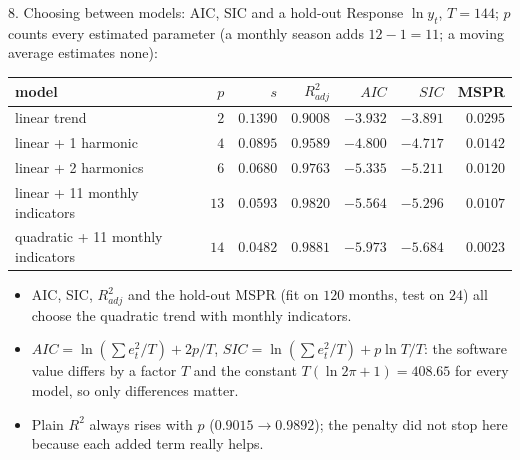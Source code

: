 \documentclass[aspectratio=169,11pt]{beamer}
\begin{document}
\begin{frame}{8. Choosing between models: AIC, SIC and a hold-out}
  \small
  Response $\ln y_t$, $T=144$; $p$ counts every estimated parameter (a monthly
  season adds $12-1=11$; a moving average estimates none):

  \vspace{0.3em}
  {\scriptsize\setlength{\tabcolsep}{3pt}
  \begin{tabular}{@{}lrrrrrr@{}}
    \toprule
    model & $p$ & $s$ & $R^2_{adj}$ & $AIC$ & $SIC$ & MSPR \\
    \midrule
    linear trend                  & $2$  & $0.1390$ & $0.9008$ & $-3.932$ & $-3.891$ & $0.0295$ \\
    linear + 1 harmonic           & $4$  & $0.0895$ & $0.9589$ & $-4.800$ & $-4.717$ & $0.0142$ \\
    linear + 2 harmonics          & $6$  & $0.0680$ & $0.9763$ & $-5.335$ & $-5.211$ & $0.0120$ \\
    linear + 11 monthly indicators & $13$ & $0.0593$ & $0.9820$ & $-5.564$ & $-5.296$ & $0.0107$ \\
    quadratic + 11 monthly indicators & $14$ & $0.0482$ & $0.9881$ & $-5.973$ & $-5.684$ & $0.0023$ \\
    \bottomrule
  \end{tabular}}

  \vspace{0.4em}
  \begin{itemize}
    \item AIC, SIC, $R^2_{adj}$ and the hold-out MSPR (fit on $120$ months,
          test on $24$) all choose the quadratic trend with monthly indicators.
    \item $AIC=\ln(\sum e_t^2/T)+2p/T$, $SIC=\ln(\sum e_t^2/T)+p\ln T/T$:
          the software value differs by a factor $T$ and the constant
          $T(\ln2\pi+1)=408.65$ for every model, so only differences matter.
    \item Plain $R^2$ always rises with $p$ ($0.9015\to0.9892$); the penalty
          did not stop here because each added term really helps.
  \end{itemize}
\end{frame}
\end{document}

